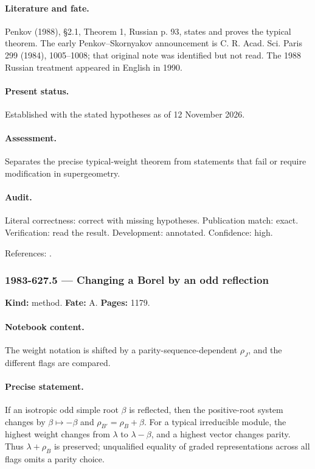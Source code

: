 \paragraph{Literature and fate.} Penkov (1988), \S2.1, Theorem 1, Russian p. 93, states and proves the typical theorem. The early Penkov–Skornyakov announcement is C. R. Acad. Sci. Paris 299 (1984), 1005–1008; that original note was identified but not read. The 1988 Russian treatment appeared in English in 1990.

\paragraph{Present status.} Established with the stated hypotheses as of 12 November 2026.

\paragraph{Assessment.} Separates the precise typical-weight theorem from statements that fail or require modification in supergeometry.

\paragraph{Audit.} Literal correctness: correct with missing hypotheses. Publication match: exact. Verification: read the result. Development: annotated. Confidence: high.

\noindent References: \citep{penkov1988borel,penkovskornyakov1984borel}.\par

\subsubsection{1983-627.5 --- Changing a Borel by an odd reflection}

\label{item:1983-627.5}

\noindent\textbf{Kind:} method. \textbf{Fate:} A. \textbf{Pages:} 1179.\par

\paragraph{Notebook content.} The weight notation is shifted by a parity-sequence-dependent \(\rho_J\), and the different flags are compared.

\paragraph{Precise statement.} If an isotropic odd simple root \(\beta\) is reflected, then the positive-root system changes by \(\beta\mapsto-\beta\) and \(\rho_{B'}=\rho_B+\beta\). For a typical irreducible module, the highest weight changes from \(\lambda\) to \(\lambda-\beta\), and a highest vector changes parity. Thus \(\lambda+\rho_B\) is preserved; unqualified equality of graded representations across all flags omits a parity choice.

